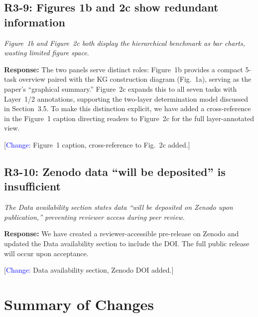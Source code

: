 \documentclass[11pt,a4paper]{article}
\begin{document}
\subsection*{R3-9: Figures 1b and 2c show redundant information}

\textit{Figure~1b and Figure~2c both display the hierarchical benchmark as bar
charts, wasting limited figure space.}

\textbf{Response:} The two panels serve distinct roles: Figure~1b provides a
compact 5-task overview paired with the KG construction diagram (Fig.~1a),
serving as the paper's ``graphical summary.'' Figure~2c expands this to all
seven tasks with Layer~1/2 annotations, supporting the two-layer determination
model discussed in Section~3.5. To make this distinction explicit, we have added
a cross-reference in the Figure~1 caption directing readers to Figure~2c for the
full layer-annotated view.

[\textcolor{blue}{Change:} Figure~1 caption, cross-reference to Fig.~2c added.]

\subsection*{R3-10: Zenodo data ``will be deposited'' is insufficient}

\textit{The Data availability section states data ``will be deposited on Zenodo
upon publication,'' preventing reviewer access during peer review.}

\textbf{Response:} We have created a reviewer-accessible pre-release on Zenodo
and updated the Data availability section to include the DOI. The full public
release will occur upon acceptance.

[\textcolor{blue}{Change:} Data availability section, Zenodo DOI added.]

\section*{Summary of Changes}
\end{document}
